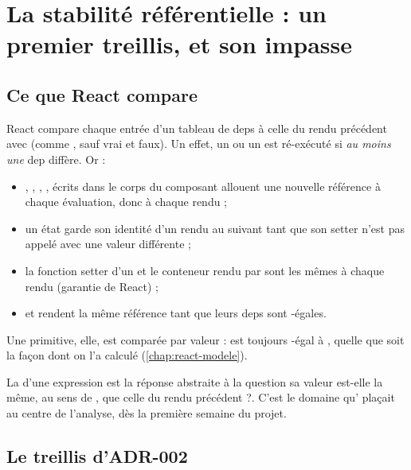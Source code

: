 \section{La stabilité référentielle : un premier treillis, et son impasse}
\label{sec:statevalue-stabilite-naif}

\subsection{Ce que React compare}

\begin{react}
  React compare chaque entrée d'un tableau de deps à celle du rendu
  précédent avec  (comme \code{===}, sauf
   vrai et  faux). Un effet,
  un  ou un  est ré-exécuté si \emph{au moins
  une} dep diffère. Or :
  \begin{itemize}
    \item \code{{}}, \code{[]}, \code{() => {}}, ,
       écrits dans le corps du composant allouent une
      nouvelle référence à chaque évaluation, donc à chaque rendu ;
    \item un état garde son identité d'un rendu au suivant tant que son
      setter n'est pas appelé avec une valeur différente ;
    \item la fonction setter d'un  et le conteneur rendu par
       sont les mêmes à chaque rendu (garantie de React) ;
    \item {} et  rendent la même référence tant
      que leurs deps sont -égales.
  \end{itemize}
  Une primitive, elle, est comparée par valeur :  est toujours
  -égal à , quelle que soit la façon dont on l'a
  calculé (\cref{chap:react-modele}).
\end{react}

La  d'une expression est la réponse
abstraite à la question \og sa valeur est-elle la même, au sens de
, que celle du rendu précédent ?\fg{}. C'est le domaine
qu' plaçait au centre de l'analyse, dès la première semaine du
projet.

\subsection{Le treillis d'ADR-002}

